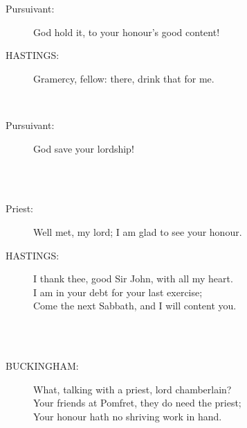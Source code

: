 \documentclass{article}
\begin{document}
\begin{description}
\item[Pursuivant:] 
\hspace{1pt}God hold it, to your honour's good content!\\
\end{description}
\begin{description}
\item[HASTINGS:] 
\hspace{1pt}Gramercy, fellow: there, drink that for me.\\
\end{description}
\\
\begin{description}
\item[Pursuivant:] 
\hspace{1pt}God save your lordship!\\
\end{description}
\centering{\it [Exit]}\\
\\
\begin{description}
\item[Priest:] 
\hspace{1pt}Well met, my lord; I am glad to see your honour.\\
\end{description}
\begin{description}
\item[HASTINGS:] 
\hspace{1pt}I thank thee, good Sir John, with all my heart.\\
\hspace{1pt}I am in your debt for your last exercise;\\
\hspace{1pt}Come the next Sabbath, and I will content you.\\
\end{description}
\\
\\
\begin{description}
\item[BUCKINGHAM:] 
\hspace{1pt}What, talking with a priest, lord chamberlain?\\
\hspace{1pt}Your friends at Pomfret, they do need the priest;\\
\hspace{1pt}Your honour hath no shriving work in hand.\\
\end{description}
\end{document}
